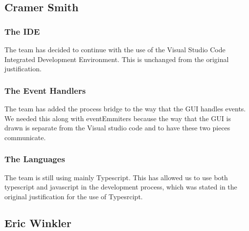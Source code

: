\documentclass[letterpaper,10pt,titlepage,draftclsnofoot,onecolumn,onesided] {IEEEtran}
\begin{document}
\subsection{Cramer Smith}

\subsubsection{The IDE}
The team has decided to continue with the use of the Visual Studio Code Integrated Development Environment.
This is unchanged from the original justification. 

\subsubsection{The Event Handlers}
The team has added the process bridge to the way that the GUI handles events.
We needed this along with eventEmmiters because the way that the GUI is drawn is separate from the Visual studio code and to have these two pieces communicate. 

\subsubsection{The Languages}
The team is still using mainly Typescript.
This has allowed us to use both typescript and javascript in the development process, which was stated in the original justification for the use of Typesrcipt. 




\subsection{Eric Winkler}



\pagebreak


\end{document}
